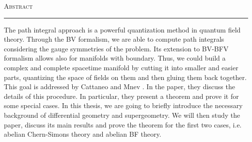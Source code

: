 \thispagestyle{plain}
\vspace*{3cm}
\begin{center}
    \textsc{\LARGE Abstract}

    \rule{5cm}{0.4pt}

    \vspace{1cm}
\end{center}
The path integral approach is a powerful quantization method in quantum field theory.
Through the BV formalism, we are able to compute path integrals considering the gauge symmetries of the problem.
Its extension to BV-BFV formalism allows also for manifolds with boundary.
Thus, we could build a complex and complete spacetime manifold by cutting it into smaller and easier parts, quantizing the space of fields on them and then gluing them back together.
This goal is addressed by Cattaneo and Mnev \cite{Gluing_BV-BFV}.
In the paper, they discuss the details of this procedure.
In particular, they present a theorem and prove it for some special cases.
In this thesis, we are going to briefly introduce the necessary background of differential geometry and supergeometry.
We will then study the paper, discuss its main results and prove the theorem for the first two cases, i.e. abelian Chern-Simons theory and abelian BF theory.

\restoregeometry
\newpage
